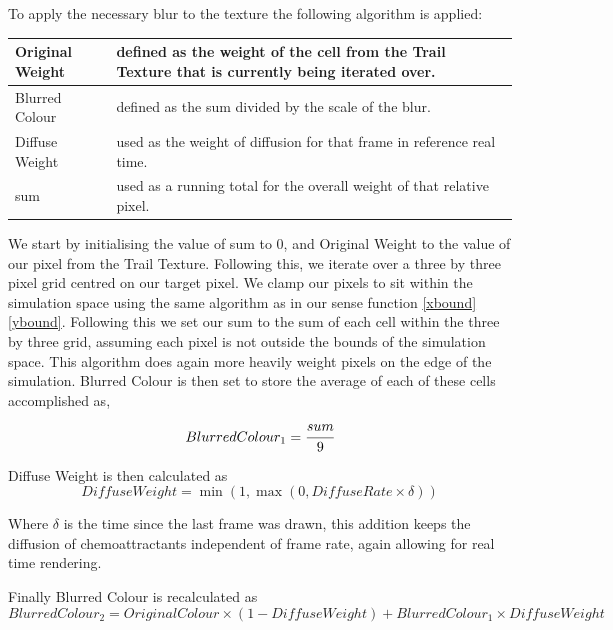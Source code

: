 \documentclass[]{report}
\begin{document}
To apply the necessary blur to the texture the following algorithm is applied:

\begin{center}
\begin{tabular}{ | m{8em} | m{7cm}| } 
  \hline
   Original Weight & defined as the weight of the cell from the Trail Texture that is currently being iterated over. \\
  \hline
   Blurred Colour &  defined as the sum divided by the scale of the blur.\\ 
  \hline
   Diffuse Weight &  used as the weight of diffusion for that frame in reference real time.\\ 
  \hline
   sum & used as a running total for the overall weight of that relative pixel.\\ 
  \hline
\end{tabular}
\end{center}

We start by initialising the value of sum to 0, and Original Weight to the value of our pixel from the Trail Texture. Following this, we iterate over a three by three pixel grid centred on our target pixel. We clamp our pixels to sit within the simulation space using the same algorithm as in our sense function \eqref{xbound}\eqref{ybound}. Following this we set our sum to the sum of each cell within the three by three grid, assuming each pixel is not outside the bounds of the simulation space. This algorithm does again more heavily weight pixels on the edge of the simulation. Blurred Colour is then set to store the average of each of these cells accomplished as,
\begin{equation}
    BlurredColour_1 =\cfrac{sum}{9}
\end{equation}

Diffuse Weight is then calculated as
\begin{equation}
    DiffuseWeight = \min{(1, \max{(0, DiffuseRate \times \delta)})}
\end{equation}

Where $\delta$ is the time since the last frame was drawn, this addition keeps the diffusion of chemoattractants independent of frame rate, again allowing for real time rendering.

Finally Blurred Colour is recalculated as
\begin{equation}
    BlurredColour_2 = OriginalColour \times (1 - DiffuseWeight) + BlurredColour_1 \times DiffuseWeight
\end{equation}
\end{document}
